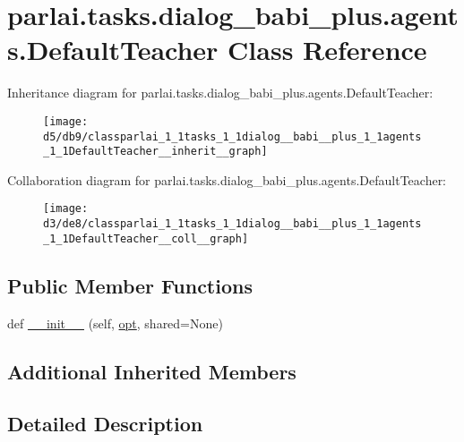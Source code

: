 \hypertarget{classparlai_1_1tasks_1_1dialog__babi__plus_1_1agents_1_1DefaultTeacher}{}\section{parlai.\+tasks.\+dialog\+\_\+babi\+\_\+plus.\+agents.\+Default\+Teacher Class Reference}
\label{classparlai_1_1tasks_1_1dialog__babi__plus_1_1agents_1_1DefaultTeacher}


Inheritance diagram for parlai.\+tasks.\+dialog\+\_\+babi\+\_\+plus.\+agents.\+Default\+Teacher\+:
\nopagebreak
\begin{figure}[H]
\begin{center}
\leavevmode
\texttt{[image: d5/db9/classparlai\_1\_1tasks\_1\_1dialog\_\_babi\_\_plus\_1\_1agents\_1\_1DefaultTeacher\_\_inherit\_\_graph]}
\end{center}
\end{figure}


Collaboration diagram for parlai.\+tasks.\+dialog\+\_\+babi\+\_\+plus.\+agents.\+Default\+Teacher\+:
\nopagebreak
\begin{figure}[H]
\begin{center}
\leavevmode
\texttt{[image: d3/de8/classparlai\_1\_1tasks\_1\_1dialog\_\_babi\_\_plus\_1\_1agents\_1\_1DefaultTeacher\_\_coll\_\_graph]}
\end{center}
\end{figure}
\subsection*{Public Member Functions}
\begin{DoxyCompactItemize}
\item 
def \hyperlink{classparlai_1_1tasks_1_1dialog__babi__plus_1_1agents_1_1DefaultTeacher_a672986e909678e098b1315a614611c32}{\+\_\+\+\_\+init\+\_\+\+\_\+} (self, \hyperlink{classparlai_1_1core_1_1teachers_1_1FbDialogTeacher_af7a9ec497b9cd0292d7b8fa220da7c28}{opt}, shared=None)
\end{DoxyCompactItemize}
\subsection*{Additional Inherited Members}


\subsection{Detailed Description}



